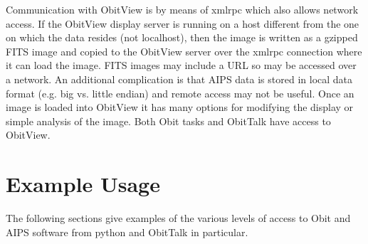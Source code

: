 \documentclass[11pt]{report}
\begin{document}
Communication with ObitView is by means of xmlrpc which also allows
network access.
If the ObitView display server is running on a host different from the 
one on which the data resides (not localhost), then the image is
written as a gzipped FITS image and copied to the ObitView server
over the xmlrpc connection where it can load the image.
FITS images may include a URL so may be accessed over a network.
An additional complication is that AIPS data is stored in local data
format (e.g. big vs. little endian) and remote access may not be
useful.
Once an image is loaded into ObitView it has many options for
modifying the display or simple analysis of the image.
Both Obit tasks and ObitTalk have access to ObitView.

\section{Example Usage}
The following sections give examples of the various levels of access
to Obit and AIPS software from python and ObitTalk in particular.
\end{document}
